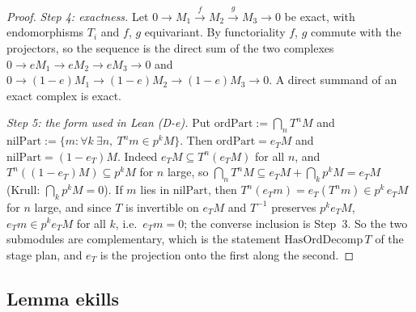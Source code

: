 \begin{proof}
\emph{Step 4: exactness.} Let $0\to M_1\xrightarrow{f}M_2\xrightarrow{g}M_3\to0$ be exact, with endomorphisms $T_i$ and $f$, $g$
equivariant. By functoriality $f$, $g$ commute with the projectors, so the sequence is the direct sum of the two complexes
$0\to e M_1\to eM_2\to eM_3\to0$ and $0\to(1-e)M_1\to(1-e)M_2\to(1-e)M_3\to0$. A direct summand of an exact complex is exact.

\emph{Step 5: the form used in Lean (D-e).} Put $\mathrm{ordPart}:=\bigcap_nT^nM$ and $\mathrm{nilPart}:=\{m:\forall k\ \exists n,\
T^nm\in p^kM\}$. Then $\mathrm{ordPart}=e_TM$ and $\mathrm{nilPart}=(1-e_T)M$. Indeed $e_TM\subseteq T^n(e_TM)$ for all $n$, and
$T^n((1-e_T)M)\subseteq p^kM$ for $n$ large, so $\bigcap_nT^nM\subseteq e_TM+\bigcap_kp^kM=e_TM$ (Krull: $\bigcap_kp^kM=0$). If $m$
lies in $\mathrm{nilPart}$, then $T^n(e_Tm)=e_T(T^nm)\in p^k\,e_TM$ for $n$ large, and since $T$ is invertible on $e_TM$ and
$T^{-1}$ preserves $p^ke_TM$, $e_Tm\in p^ke_TM$ for all $k$, i.e.\ $e_Tm=0$; the converse inclusion is Step~3. So the two
submodules are complementary, which is the statement $\mathrm{HasOrdDecomp}\,T$ of the stage plan, and $e_T$ is the projection
onto the first along the second.
\end{proof}

\subsection{Lemma ekills}

